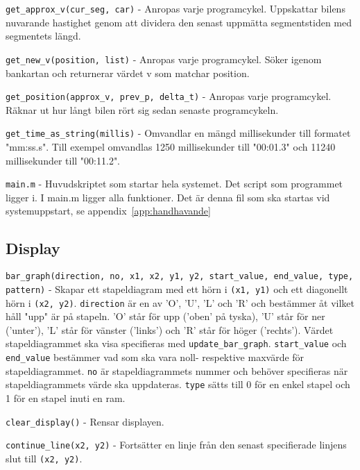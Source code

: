 \texttt{get\_approx\_v(cur\_seg, car)} - Anropas varje programcykel. Uppskattar
bilens nuvarande hastighet genom att dividera den senast uppmätta segmentstiden
med segmentets längd.


\texttt{get\_new\_v(position, list)} - Anropas varje programcykel. Söker igenom
bankartan och returnerar värdet v som matchar position.

\texttt{get\_position(approx\_v, prev\_p, delta\_t)} - Anropas varje
programcykel. Räknar ut hur långt bilen rört sig sedan senaste programcykeln.


\texttt{get\_time\_as\_string(millis)} - Omvandlar en mängd millisekunder till
formatet "mm:ss.s". Till exempel omvandlas 1250 millisekunder till "00:01.3" och
11240 millisekunder till "00:11.2".

\texttt{main.m} - Huvudskriptet som startar hela systemet. Det script som
programmet ligger i. I main.m ligger alla funktioner. Det är denna fil som ska
startas vid systemuppstart, se appendix~\ref{app:handhavande}


\subsection{Display}
\label{app:funktioner och filer:display}

\texttt{bar\_graph(direction, no, x1, x2, y1, y2, start\_value, end\_value,
type, pattern)} - Skapar ett stapeldiagram med ett hörn i \texttt{(x1, y1)} och
ett diagonellt hörn i \texttt{(x2, y2)}. \texttt{direction} är en av 'O', 'U',
'L' och 'R' och bestämmer åt vilket håll "upp" är på stapeln. 'O' står för upp
('oben' på tyska), 'U' står för ner ('unter'), 'L' står för vänster ('links')
och 'R' står för höger ('rechts'). Värdet stapeldiagrammet ska visa specifieras
med \texttt{update\_bar\_graph}. \texttt{start\_value} och \texttt{end\_value}
bestämmer vad som ska vara noll- respektive maxvärde för stapeldiagrammet.
\texttt{no} är stapeldiagrammets nummer och behöver specifieras när
stapeldiagrammets värde ska uppdateras. \texttt{type} sätts till 0 för en enkel
stapel och 1 för en stapel inuti en ram.

\texttt{clear\_display()} - Rensar displayen.

\texttt{continue\_line(x2, y2)} - Fortsätter en linje från den senast specifierade
linjens slut till \texttt{(x2, y2)}.

